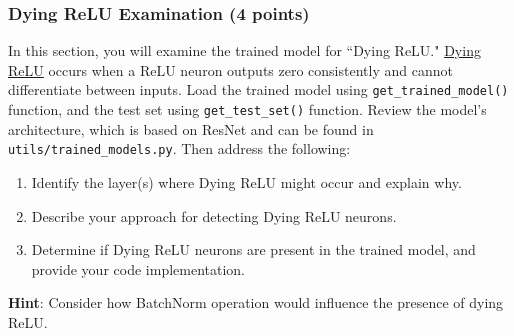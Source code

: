 \documentclass[11pt, oneside]{article}   	%
\begin{document}
\subsubsection*{Dying ReLU Examination (4 points)}
In this section, you will examine the trained model for ``Dying ReLU." \href{https://datascience.stackexchange.com/questions/5706/what-is-the-dying-relu-problem-in-neural-networks}{Dying ReLU} occurs when a ReLU neuron outputs zero consistently and cannot differentiate between inputs. 
Load the trained model using \texttt{get\_trained\_model()} function, and the test set using \texttt{get\_test\_set()} function. Review the model's architecture, which is based on ResNet and can be found in \texttt{utils/trained\_models.py}. Then address the following:

\begin{enumerate}
    \item Identify the layer(s) where Dying ReLU might occur and explain why.
    \item Describe your approach for detecting Dying ReLU neurons. 
    \item Determine if Dying ReLU neurons are present in the trained model, and provide your code implementation.
\end{enumerate}
\textbf{Hint}:
Consider how BatchNorm operation would influence the presence of dying ReLU.
\end{document}
